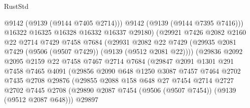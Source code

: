 \begin{lexlean}{RustStd}
\begin{coremodule}
                              @9142
                              (@9139 (@9144 @7405 @2714)))
                            @9142
                            (@9139 (@9144 @7395 @7416)))
                          @16322
                          @16325
                          @16328
                          @16332
                          @16337
                          @29180)
                        (@29921
                          @7426
                          @2082
                          @2160
                          @22
                          @2714
                          @7429
                          @7458
                          @7684
                          (@29931
                            @2082
                            @22
                            @7429
                            (@29935 @2081 @7429 (@9506 (@9507 @7429)) (@9139 (@9512 @2081 @22))))
                          (@29836
                            @2092
                            @2095
                            @2159
                            @22
                            @7458
                            @7467
                            @2714
                            @7684
                            (@29847
                              @2091
                              @1301
                              @291
                              @7458
                              @7465
                              @4091
                              (@29856
                                @2090
                                @648
                                @1250
                                @3087
                                @7457
                                @7464
                                @2702
                                @7435
                                @2708
                                @29876
                                (@29855
                                  @2088
                                  @158
                                  @648
                                  @27
                                  @7454
                                  @2714
                                  @2727
                                  @2702
                                  @7445
                                  @2708
                                  (@29890
                                    @2087
                                    @7454
                                    (@9506 (@9507 @7454))
                                    (@9139 (@9512 @2087 @648)))
                                  @29897

\end{coremodule}
\end{lexlean}
